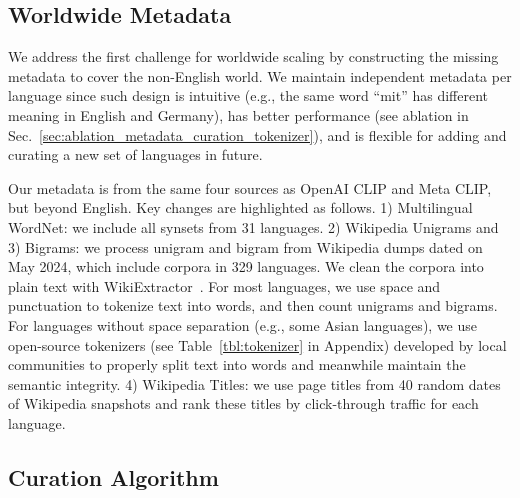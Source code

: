 \subsection{Worldwide Metadata}

We address the first challenge for worldwide scaling by constructing 
the missing metadata to cover the non-English world.
We maintain independent metadata per language since such design is intuitive (e.g., the same word ``mit'' has different meaning in English and Germany), has better performance (see ablation in Sec.~\ref{sec:ablation_metadata_curation_tokenizer}), and is flexible for adding and curating a new set of languages in future.

Our metadata is from the same four sources as OpenAI CLIP and Meta CLIP, but beyond English. Key changes are highlighted as follows. 
1) Multilingual WordNet: we include all synsets from 31 languages. 2) Wikipedia Unigrams and 3) Bigrams: we process unigram and bigram from Wikipedia dumps dated on May 2024, which include corpora in 329 languages. We clean the corpora into plain text with WikiExtractor~\citep{wikiextractor}. For most languages, we use space and punctuation to tokenize text into words, and then count unigrams and bigrams. For languages without space separation (e.g., some Asian languages), we use open-source tokenizers (see Table~\ref{tbl:tokenizer} in Appendix) developed by local communities to properly split text into words and meanwhile maintain the semantic integrity. 
4) Wikipedia Titles: we use page titles from 40 random dates of Wikipedia snapshots and rank these titles by click-through traffic for each language.

\subsection{Curation Algorithm}

